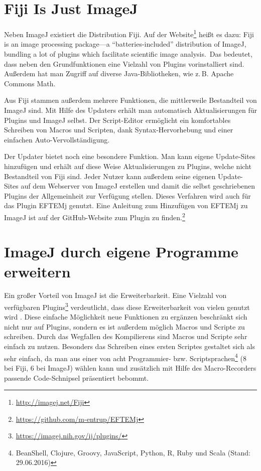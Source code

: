 \documentclass[
	paper=a4,				%
	twoside=true,			%
	BCOR=6mm,				%
	fontsize=12pt,			%
	pagesize=auto,			%
	numbers=noenddot,		%
	bibliography=totoc,		%
	draft=false
]{scrartcl}
\begin{document}
\section{Fiji Is Just ImageJ}

Neben ImageJ existiert die Distribution Fiji. Auf der Website\footnote{\url{http://imagej.net/Fiji}} heißt es dazu: \glqq Fiji is an image processing package—a ``batteries-included'' distribution of ImageJ, bundling a lot of plugins which facilitate scientific image analysis.\grqq\ Das bedeutet, dass neben den Grundfunktionen eine Vielzahl von Plugins vorinstalliert sind. Außerdem hat man Zugriff auf diverse Java-Bibliotheken, wie z.\,B. Apache Commons Math.

Aus Fiji stammen außerdem mehrere Funktionen, die mittlerweile Bestandteil von ImageJ sind. Mit Hilfe des Updaters erhält man automatisch Aktualisierungen für Plugins und ImageJ selbst. Der Script-Editor ermöglicht ein komfortables Schreiben von Macros und Scripten, dank Syntax-Hervorhebung und einer einfachen Auto-Vervollständigung.

Der Updater bietet noch eine besondere Funktion. Man kann eigene Update-Sites hinzufügen und erhält auf diese Weise Aktualisierungen zu Plugins, welche nicht Bestandteil von Fiji sind. Jeder Nutzer kann außerdem seine eigenen Update-Sites auf dem Webserver von ImageJ erstellen und damit die selbst geschriebenen Plugins der Allgemeinheit zur Verfügung stellen. Dieses Verfahren wird auch für das Plugin EFTEMj genutzt. Eine Anleitung zum Hinzufügen von EFTEMj zu ImageJ ist auf der GitHub-Website zum Plugin zu finden.\footnote{\url{https://github.com/m-entrup/EFTEMj}}

\section{ImageJ durch eigene Programme erweitern}

Ein großer Vorteil von ImageJ ist die Erweiterbarkeit. Eine Vielzahl von verfügbaren Plugins\footnote{\url{https://imagej.nih.gov/ij/plugins/}} verdeutlicht, dass diese Erweiterbarkeit von vielen genutzt wird \cite{collins_imagej_2007}. Diese einfache Möglichkeit neue Funktionen zu ergänzen beschränkt sich nicht nur auf Plugins, sondern es ist außerdem möglich Macros und Scripte zu schreiben. Durch das Wegfallen des Kompilierens sind Macros und Scripte sehr einfach zu nutzen. Besonders das Schreiben eines ersten Scriptes gestaltet sich als sehr einfach, da man aus einer von acht Programmier- bzw. Scriptsprachen\footnote{BeanShell, Clojure, Groovy, JavaScript, Python, R, Ruby und Scala (Stand: 29.06.2016)} (8 bei Fiji, 6 bei ImageJ) wählen kann und zusätzlich mit Hilfe des Macro-Recorders passende Code-Schnipsel präsentiert bebommt.
\end{document}
